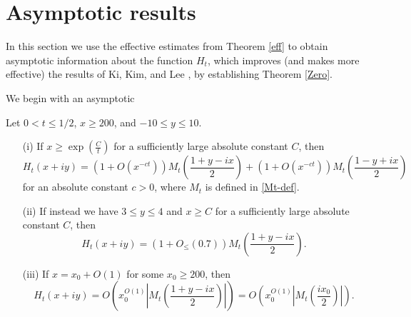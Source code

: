 \section{Asymptotic results}\label{asymptotic-sec}

In this section we use the effective estimates from Theorem \ref{eff} to obtain asymptotic information about the function $H_t$, which improves (and makes more effective) the results of Ki, Kim, and Lee \cite{kkl}, by establishing Theorem \ref{Zero}.

We begin with an asymptotic

\begin{proposition}\label{asymp}  Let $0 < t \leq 1/2$, $x \geq 200$, and $-10 \leq y \leq 10$.
\begin{itemize}
\item[(i)]  If $x \geq \exp(\frac{C}{t})$ for a sufficiently large absolute constant $C$, then
$$ H_t(x+iy) = (1 + O(x^{-ct})) M_t\left(\frac{1+y-ix}{2}\right) + (1 + O(x^{-ct})) M_t\left(\frac{1-y+ix}{2} \right) $$
for an absolute constant $c>0$, where $M_t$ is defined in \eqref{Mt-def}.  
\item[(ii)]  If instead we have $3 \leq y \leq 4$ and $x \geq C$ for a sufficiently large absolute constant $C$, then
$$ H_t(x+iy) = (1 + O_{\leq}(0.7)) M_t\left(\frac{1+y-ix}{2}\right).$$
\item[(iii)]  If $x = x_0 + O(1)$ for some $x_0 \geq 200$, then
$$ H_t(x+iy) = O( x_0^{O(1)} |M_t(\frac{1+y-ix}{2})| ) = O( x_0^{O(1)} |M_t(\frac{ix_0}{2})| ).$$
\end{itemize}
\end{proposition}

